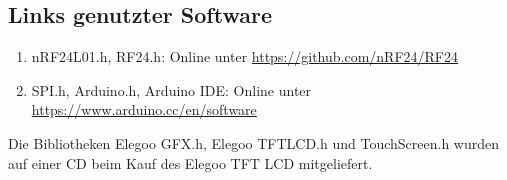 \documentclass[a4paper, 11pt]{scrartcl}
\begin{document}
\subsection{Links genutzter Software}\label{ch:softwarelinks}
\begin{enumerate}
    \item nRF24L01.h, RF24.h: Online unter \url{https://github.com/nRF24/RF24}\label{link:rf24}
    \item SPI.h, Arduino.h, Arduino IDE: Online unter \url{https://www.arduino.cc/en/software}\label{link:arduin_ide}
\end{enumerate}
Die Bibliotheken Elegoo GFX.h, Elegoo TFTLCD.h und TouchScreen.h wurden auf einer CD beim Kauf des Elegoo TFT LCD mitgeliefert.

\end{document}
